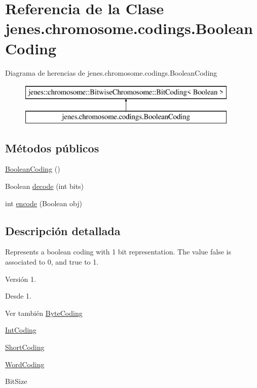 \hypertarget{classjenes_1_1chromosome_1_1codings_1_1_boolean_coding}{\section{Referencia de la Clase jenes.\-chromosome.\-codings.\-Boolean\-Coding}
\label{classjenes_1_1chromosome_1_1codings_1_1_boolean_coding}
}
Diagrama de herencias de jenes.\-chromosome.\-codings.\-Boolean\-Coding\begin{figure}[H]
\begin{center}
\leavevmode
\includegraphics[height=2.000000cm]{classjenes_1_1chromosome_1_1codings_1_1_boolean_coding}
\end{center}
\end{figure}
\subsection*{Métodos públicos}
\begin{DoxyCompactItemize}
\item 
\hyperlink{classjenes_1_1chromosome_1_1codings_1_1_boolean_coding_a3a8318406c4a080fa5b39899de1831df}{Boolean\-Coding} ()
\item 
Boolean \hyperlink{classjenes_1_1chromosome_1_1codings_1_1_boolean_coding_a38188e39066ecd06e4c839bced2038d3}{decode} (int bits)
\item 
int \hyperlink{classjenes_1_1chromosome_1_1codings_1_1_boolean_coding_ace4181a4ef8bf37d9ad762d15422527b}{encode} (Boolean obj)
\end{DoxyCompactItemize}


\subsection{Descripción detallada}
Represents a boolean coding with 1 bit representation. The value false is associated to 0, and true to 1.

\begin{DoxyVersion}{Versión}
1. 
\end{DoxyVersion}
\begin{DoxySince}{Desde}
1.
\end{DoxySince}
\begin{DoxySeeAlso}{Ver también}
\hyperlink{classjenes_1_1chromosome_1_1codings_1_1_byte_coding}{Byte\-Coding} 

\hyperlink{classjenes_1_1chromosome_1_1codings_1_1_int_coding}{Int\-Coding} 

\hyperlink{classjenes_1_1chromosome_1_1codings_1_1_short_coding}{Short\-Coding} 

\hyperlink{classjenes_1_1chromosome_1_1codings_1_1_word_coding}{Word\-Coding} 

Bit\-Size 
\end{DoxySeeAlso}


